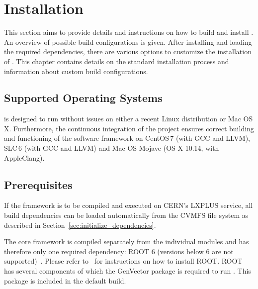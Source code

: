 \chapter{Installation}
\label{ch:installation}

This section aims to provide details and instructions on how to build and install \apsq.
An overview of possible build configurations is given.
After installing and loading the required dependencies, there are various options to customize the installation of \apsq.
This chapter contains details on the standard installation process and information about custom build configurations.

\section{Supported Operating Systems}
\label{sec:os}
\apsq is designed to run without issues on either a recent Linux distribution or Mac OS\,X.
Furthermore, the continuous integration of the project ensures correct building and functioning of the software framework on CentOS\,7 (with GCC and LLVM), SLC\,6 (with GCC and LLVM) and Mac OS Mojave (OS X 10.14, with AppleClang).

\section{Prerequisites}
\label{sec:prerequisites}
If the framework is to be compiled and executed on CERN's LXPLUS service, all build dependencies can be loaded automatically from the CVMFS file system as described in Section~\ref{sec:initialize_dependencies}.

The core framework is compiled separately from the individual modules and \apsq has therefore only one required dependency: ROOT 6 (versions below 6 are not supported)~\cite{root}.
Please refer to~\cite{rootinstallation} for instructions on how to install ROOT.
ROOT has several components of which the GenVector package is required to run \apsq.
This package is included in the default build.

